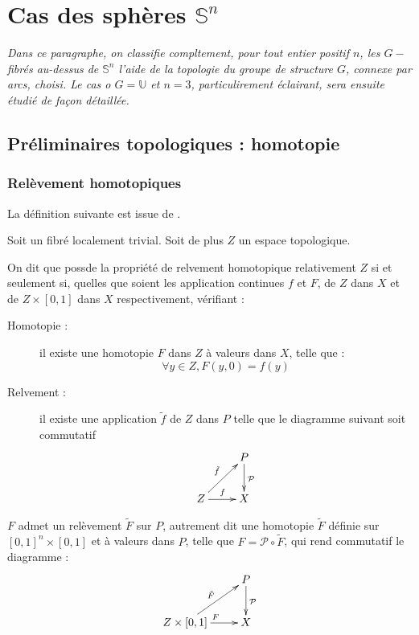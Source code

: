 \chapter{Cas des sph\`eres %
$\mathbb{S}^n$}

\emph{%
Dans ce paragraphe, on classifie compltement, pour tout entier positif $n$, les $G-$fibr\'es au-dessus de $\mathbb{S}^n$ %
 l'aide de la topologie du groupe de structure $G$, connexe par arcs, choisi. %
Le cas o $G=\mathbb{U}$ et $n=3$, particulirement \'eclairant, sera ensuite \'etudi\'e de fa\c con d\'etaill\'ee.%
}


\section{Pr\'eliminaires topologiques : homotopie}

\subsection{Rel\`evement homotopiques}

La d\'efinition suivante est issue de \cite{NaberF}.

\begin{defi}
Soit \Fiy un fibr\'e localement trivial. Soit de plus $Z$ un espace topologique.

\par
On dit que \Fiy possde la propri\'et\'e de relvement homotopique relativement  $Z$ si et seulement si, %
quelles que soient les application continues $f$ et $F$, de $Z$ dans $X$ et de $Z\times [0,1]$ dans $X$ respectivement, v\'erifiant : 

{\em%
\begin{description}
\item[Homotopie :] il existe une homotopie $F$ dans $Z$ \`a valeurs dans $X$, telle que :
\[\forall y \in Z , F(y,0) = f(y)\]
%
\item[Relvement :] il existe une application $\tilde{f}$ de $Z$ dans $P$ telle que le diagramme suivant soit commutatif
\[\xymatrix{ &P \ar[d]^{\mathcal{P}} \\ Z \ar[r]^{f} \ar[ru]^{\tilde{f}} & X}\]
\end{description}
}

$F$ admet un rel\`evement $\tilde{F}$ sur $P$, autrement dit une homotopie $\tilde{F}$ d\'efinie sur $[0,1]^n \times [0,1]$ et \`a valeurs dans $P$, %
telle que $F = \mathcal{P} \circ \tilde{F}$, qui rend commutatif le diagramme :
\[\xymatrix{ &P \ar[d]^{\mathcal{P}} \\ Z \times [0,1] \ar[r]^{F} \ar[ru]^{\tilde{F}} & X}\]
\end{defi}


